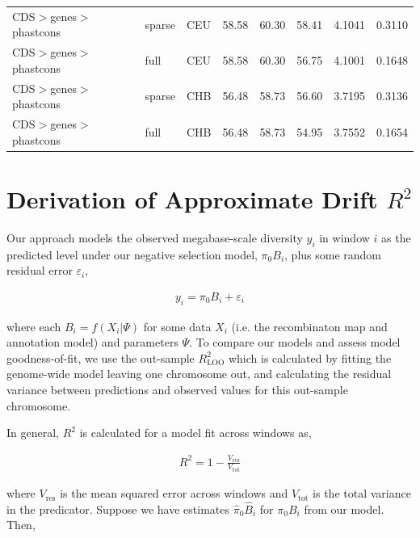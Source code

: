 \documentclass[11pt]{article}
\begin{document}
\begin{table}
\begin{tabular}{lll|crr|cc}
CDS$>$genes$>$phastcons &            sparse &          CEU &                        58.58 &             60.30 &            58.41 &                                 4.1041 &                                0.3110 \\
CDS$>$genes$>$phastcons &              full &          CEU &                        58.58 &             60.30 &            56.75 &                                 4.1001 &                                0.1648 \\
CDS$>$genes$>$phastcons &            sparse &          CHB &                        56.48 &             58.73 &            56.60 &                                 3.7195 &                                0.3136 \\
CDS$>$genes$>$phastcons &              full &          CHB &                        56.48 &             58.73 &            54.95 &                                 3.7552 &                                0.1654 \\
\hline
\end{tabular}
\end{table}


\section{Derivation of Approximate Drift $R^2$}

Our approach models the observed megabase-scale diversity $y_i$ in window $i$
as the predicted level under our negative selection model, $\pi_0 B_i$, plus
some random residual error $\varepsilon_i$,

\begin{align}
    y_i = \pi_0 B_i + \varepsilon_i
\end{align}

where each $B_i = f(X_i | \Psi)$ for some data $X_i$ (i.e. the recombinaton map
and annotation model) and parameters $\Psi$. To compare our models and assess
model goodness-of-fit, we use the out-sample $R_\text{LOO}^2$ which is
calculated by fitting the genome-wide model leaving one chromosome out, and
calculating the residual variance between predictions and observed values for
this out-sample chromosome. 

In general, $R^2$ is calculated for a model fit across windows as,

\begin{align}
    R^2 = 1 - \frac{V_\text{res}}{V_\text{tot}}
\end{align}

where $V_\text{res}$ is the mean squared error across windows and
$V_\text{tot}$ is the total variance in the predicator. Suppose we have
estimates $\widehat{\pi}_0 \widehat{B}_i$ for $\pi_0 B_i$ from our model. Then,
\end{document}
